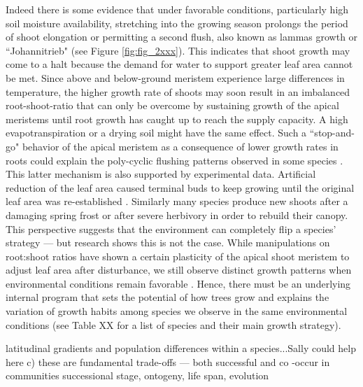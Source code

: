 \documentclass{article}
\begin{document}
Indeed there is some evidence that under favorable conditions, particularly high soil moisture availability, stretching into the growing season prolongs the period of shoot elongation or permitting a second flush, also known as lammas growth or ``Johannitrieb" (see Figure \ref{fig:fig_2xxx}). This indicates that shoot growth may come to a halt because the demand for water to support greater leaf area cannot be met. Since above and below-ground meristem experience large differences in temperature, the higher growth rate of shoots may soon result in an imbalanced root-shoot-ratio that can only be overcome by sustaining growth of the apical meristems until root growth has caught up to reach the supply capacity. A high evapotranspiration or a drying soil might have the same effect. Such a ``stop-and-go" behavior of the apical meristem as a  consequence of lower growth rates in roots could explain the poly-cyclic flushing patterns observed in some species \cite{girardPolycyclismFundamentalTree2011}. This latter mechanism is also supported by experimental data. Artificial reduction of the leaf area caused terminal buds to keep growing until the original leaf area was re-established \citep{borchertSimulationRhythmicTree1973}. Similarly many species produce new shoots after a damaging spring frost or after severe herbivory in order to rebuild their canopy. \\

This perspective suggests that the environment can completely flip a species' strategy --- but research shows this is not the case. While manipulations on root:shoot ratios have shown a certain plasticity of the apical shoot meristem to adjust leaf area after disturbance, we still observe distinct growth patterns when environmental conditions remain favorable . Hence, there must be an underlying internal program that sets the potential of how trees grow and explains the variation of growth habits among species we observe in the same environmental conditions (see Table XX for a list of species and their main growth strategy). 

latitudinal gradients and population differences within a species...Sally could help here
	c) these are fundamental trade-offs --- both successful and co -occur in communities
	successional stage, ontogeny, life span, evolution
	
\end{document}
